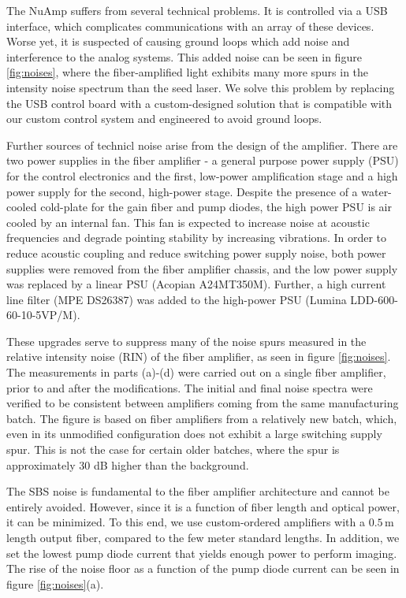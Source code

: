 \documentclass[twocolumn,aps,pra,showpacs,preprintnumbers,bibnotes]{revtex4-1}
\begin{document}
The NuAmp suffers from several technical problems. 
It is controlled via a USB interface, which complicates communications with an array of these devices.  
Worse yet, it is suspected of causing ground loops which add noise and interference to the analog systems. 
This added noise can be seen in figure \ref{fig:noises}, where the fiber-amplified light exhibits many more spurs in the intensity noise spectrum than the seed laser.
We solve this problem by replacing the USB control board with a custom-designed solution  that is compatible with our custom control system and engineered to avoid ground loops.

Further sources of technicl noise arise from the design of the amplifier. There are two power supplies in the fiber amplifier - a general purpose power supply (PSU) for the control electronics and the first, low-power amplification stage and a high power supply for the second, high-power stage. 
Despite the presence of a water-cooled cold-plate for the gain fiber and pump diodes, the high power PSU is air cooled by an internal fan.
This fan is expected to increase noise at acoustic frequencies and degrade pointing stability by increasing vibrations.
In order to reduce acoustic coupling and reduce switching power supply noise, both power supplies were removed from the fiber amplifier chassis, and the low power supply was replaced by a linear PSU (Acopian A24MT350M). 
Further, a high current line filter (MPE DS26387) was added to the high-power PSU (Lumina LDD-600-60-10-5VP/M).

These upgrades serve to suppress many of the noise spurs measured in the relative intensity noise (RIN) of the fiber amplifier, as seen in figure \ref{fig:noises}. 
The measurements in parts (a)-(d) were carried out on a single fiber amplifier, prior to and after the modifications. The initial and final noise spectra were verified to be consistent between amplifiers coming from the same manufacturing batch.
The figure is based on fiber amplifiers from a relatively new batch, which, even in its unmodified configuration does not exhibit a large switching supply spur. 
This is not the case for certain older batches, where the spur is approximately 30 dB higher than the background.

The SBS noise is fundamental to the fiber amplifier architecture and cannot be entirely avoided. However, since it is a function of fiber length and optical power, it can be minimized. To this end, we use custom-ordered amplifiers with a $0.5\,$m length output fiber, compared to the few meter standard lengths.
In addition, we set the lowest pump diode current that yields enough power to perform imaging. 
The rise of the noise floor as a function of the pump diode current can be seen in figure \ref{fig:noises}(a).
\end{document}
